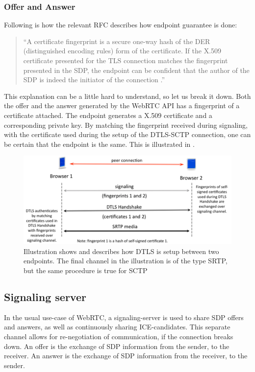     \subsubsection*{Offer and Answer}
    \label{sec:webrtc_off}
    Following is how the relevant RFC describes how endpoint guarantee is done:
    \begin{quotation}
        \enquote{A certificate fingerprint is a secure one-way hash of the DER (distinguished encoding rules) form of the certificate. If the X.509 certificate presented for the TLS connection matches the fingerprint presented in the SDP, the endpoint can be confident that the author of the SDP is indeed the initiator of the connection \cite{ar_tls_sdp}.}
    \end{quotation}
    This explanation can be a little hard to understand, so let us break it down. Both the offer and the answer generated by the WebRTC API has a fingerprint of a certificate attached. The endpoint generates a X.509 certificate and a corresponding private key. By matching the fingerprint received during signaling, with the certificate used during the setup of the DTLS-SCTP connection, one can be certain that the endpoint is the same. This is illustrated in .
    \begin{figure}[t]
      \centering
      \includegraphics[width=\textwidth]{Figures/DTLS_Exchange}
      \decoRule
      \caption[DTLS setup]{Illustration shows and describes how DTLS is setup between two endpoints. The final channel in the illustration is of the type SRTP, but the same procedure is true for SCTP \cite{WebRTCManMiddle2015}}
      \label{fig:DTLS_setup}
    \end{figure}
    \subsection{Signaling server}
    \label{sec:sign_serv}
    In the usual use-case of WebRTC, a signaling-server is used to share SDP offers and answers, as well as continuously sharing ICE-candidates. This separate channel allows for re-negotiation of communication, if the connection breaks down. An offer is the exchange of SDP information from the sender, to the receiver. An answer is the exchange of SDP information from the receiver, to the sender.

